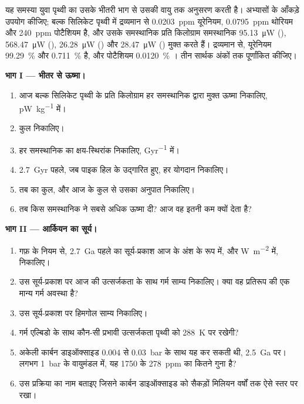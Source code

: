 \begin{problem}[{सप्ताहांत समस्या --- एक अधिक गर्म युवा पृथ्वी}]\label{pb:b2:precambrian-earth:1}
यह समस्या युवा पृथ्वी का उसके भीतरी भाग से उसकी वायु तक अनुसरण करती है।
अभ्यासों के आँकड़े उपयोग कीजिए; बल्क सिलिकेट पृथ्वी में द्रव्यमान से \qty{0.0203}{ppm} यूरेनियम, \qty{0.0795}{ppm}
थोरियम और \qty{240}{ppm} पोटैशियम है, और उसके समस्थानिक प्रति किलोग्राम समस्थानिक \qty{95.13}{\micro W}
(), \qty{568.47}{\micro W} (), \qty{26.28}{\micro W} () और
\qty{28.47}{\micro W} () मुक्त करते हैं। द्रव्यमान से, यूरेनियम
\qty{99.29}{\percent}  और \qty{0.711}{\percent}  है, और पोटैशियम
\qty{0.0120}{\percent} । तीन सार्थक अंकों तक पूर्णांकित कीजिए।

\noindent\textbf{भाग I --- भीतर से ऊष्मा।}
\begin{enumerate}
  \item आज बल्क सिलिकेट पृथ्वी के प्रति किलोग्राम हर समस्थानिक द्वारा मुक्त ऊष्मा निकालिए,
        \unit{pW.kg^{-1}} में।
  \item कुल निकालिए।
  \item हर समस्थानिक का क्षय-स्थिरांक निकालिए, \unit{Gyr^{-1}} में।
  \item \qty{2.7}{Gyr} पहले, जब पाइक हिल के  उद्गारित हुए, हर योगदान निकालिए।
  \item तब का कुल, और आज के कुल से उसका अनुपात निकालिए।
  \item तब किस समस्थानिक ने सबसे अधिक ऊष्मा दी? आज वह इतनी कम क्यों देता है?
\end{enumerate}

\noindent\textbf{भाग II --- आर्कियन का सूर्य।}
\begin{enumerate}[resume]
  \item गफ़ के नियम से, \qty{2.7}{Ga} पहले का सूर्य-प्रकाश आज के अंश के रूप में, और
        \unit{W.m^{-2}} में, निकालिए।
  \item उस सूर्य-प्रकाश पर आज की उत्सर्जकता के साथ गर्म साम्य निकालिए। क्या वह प्रतिरूप की एक मान्य गर्म
        अवस्था है?
  \item उस सूर्य-प्रकाश पर हिमगोल साम्य निकालिए।
  \item गर्म एल्बिडो के साथ कौन-सी प्रभावी उत्सर्जकता पृथ्वी को \qty{288}{K} पर रखेगी?
  \item अकेली कार्बन डाइऑक्साइड 0.004 से \qty{0.03}{bar} के साथ यह कर सकती थी, \qty{2.5}{Ga} पर।
        लगभग \qty{1}{bar} के वायुमंडल में, यह 1750 के \qty{278}{ppm} का कितने गुना
        है?
  \item उस प्रक्रिया का नाम बताइए जिसने कार्बन डाइऑक्साइड को सैकड़ों मिलियन वर्षों तक ऐसे स्तर पर
        रखा।
\end{enumerate}


\end{problem}
